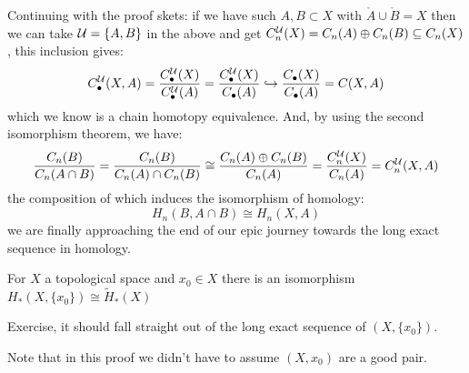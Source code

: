 \documentclass[a4paper]{article}
\begin{document}
Continuing with the proof skets: if we have such $A,B\subset X$ with $\mathring{A}\cup\mathring{B}=X$ then we can take $\mathcal{U}=\{A,B\}$ in the above and get $C_n^{\mathcal{U}}(X)=C_n(A)\oplus C_n(B) \subseteq C_n(X)$, this inclusion gives:\[
    C_\bullet^{\mathcal{U}}(X,A)=\frac{C_\bullet^{\mathcal{U}}(X)}{C_\bullet^{\mathcal{U}}(A)} = \frac{C_\bullet^{\mathcal{U}}(X)}{C_\bullet(A)} \hookrightarrow \frac{C_\bullet(X)}{C_\bullet(A)} = C(X,A)
\]
which we know is a chain homotopy equivalence. And, by using the second isomorphism theorem, we have: \[
    \frac{C_n(B)}{C_n(A\cap B)} = \frac{C_n(B)}{C_n(A)\cap C_n(B)} \cong \frac{C_n(A)\oplus C_n(B)}{C_n(A)} = \frac{C_n^{\mathcal{U}}(X)}{C_n(A)} = C_n^{\mathcal{U}}(X,A)
\]
the composition of which induces the isomorphism of homology:\[
    H_n(B,A\cap B) \cong H_n(X,A)
\]
we are finally approaching the end of our epic journey towards the long exact sequence in homology.
\begin{lemma}
    For $X$ a topological space and $x_0\in X$ there is an isomorphism $H_*(X,\{x_0\})\cong\tilde{H}_*(X)$
    \begin{prf}
        Exercise, it should fall straight out of the long exact sequence of $(X,\{x_0\})$.
    \end{prf}
\end{lemma}
Note that in this proof we didn't have to assume $(X,x_0)$ are a good pair.
\end{document}
